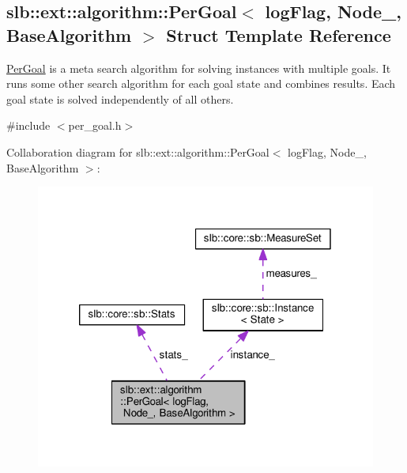 \hypertarget{structslb_1_1ext_1_1algorithm_1_1PerGoal}{}\subsection{slb\+:\+:ext\+:\+:algorithm\+:\+:Per\+Goal$<$ log\+Flag, Node\+\_\+, Base\+Algorithm $>$ Struct Template Reference}
\label{structslb_1_1ext_1_1algorithm_1_1PerGoal}


{\ttfamily \hyperlink{structslb_1_1ext_1_1algorithm_1_1PerGoal}{Per\+Goal}} is a meta search algorithm for solving instances with multiple goals. It runs some other search algorithm for each goal state and combines results. Each goal state is solved independently of all others.  




{\ttfamily \#include $<$per\+\_\+goal.\+h$>$}



Collaboration diagram for slb\+:\+:ext\+:\+:algorithm\+:\+:Per\+Goal$<$ log\+Flag, Node\+\_\+, Base\+Algorithm $>$\+:\nopagebreak
\begin{figure}[H]
\begin{center}
\leavevmode
\includegraphics[width=320pt]{structslb_1_1ext_1_1algorithm_1_1PerGoal__coll__graph}
\end{center}
\end{figure}

